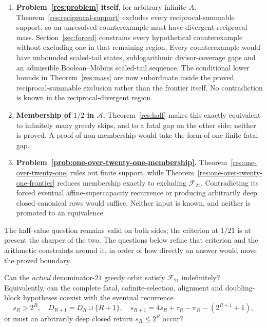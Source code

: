 \documentclass[11pt]{article}
\newcommand{\Ach}{\mathcal A}
\begin{document}
\begin{enumerate}
\item \textbf{Problem~\ref{res:problem} itself}, for arbitrary infinite $A$.
  Theorem~\ref{res:reciprocal-support} excludes every reciprocal-summable
  support, so an unresolved counterexample must have divergent reciprocal
  mass.  Section~\ref{sec:forced} constrains every hypothetical counterexample
  without excluding one in that remaining region.  Every counterexample would have
  unbounded scaled-tail states, sublogarithmic divisor-coverage gaps and an
  admissible Boolean--M\"obius scaled-tail sequence.  The conditional lower
  bounds in Theorem~\ref{res:mass} are now subordinate inside the proved
  reciprocal-summable exclusion rather than the frontier itself.  No
  contradiction is known in the reciprocal-divergent region.
\item \textbf{Membership of $1/2$ in $\Ach$.}  Theorem~\ref{res:half} makes
  this exactly equivalent to infinitely many greedy skips, and to a fatal gap
  on the other side; neither is proved.  A proof of non-membership would take
  the form of one finite fatal gap.
\item \textbf{Problem~\ref{prob:one-over-twenty-one-membership}.}
  Theorem~\ref{res:one-over-twenty-one} rules out finite support, while
  Theorem~\ref{res:one-over-twenty-one-frontier} reduces membership exactly
  to excluding $\mathcal F_{21}$.  Contradicting its forced eventual
  affine-supercapacity recurrence or producing arbitrarily deep closed
  canonical rows would suffice.  Neither input is known, and neither is
  promoted to an equivalence.
\end{enumerate}

\noindent The half-value question remains valid on both sides; the criterion at
$1/21$ is at present the sharper of the two.  The questions below refine that
criterion and the arithmetic constraints around it, in order of how directly
an answer would move the proved boundary.

\begin{problem}\label{prob:affine-supercapacity}
Can the \emph{actual} denominator-$21$ greedy orbit satisfy
$\mathcal F_{21}$ indefinitely?  Equivalently, can the complete fatal,
cofinite-selection, alignment and doubling-block hypotheses coexist with the
eventual recurrence
\[
 s_R>2^R,\quad D_{R+1}=D_R\cup\{R+1\},\quad
 s_{R+1}=4s_R+\tau_R-\pi_R-(2^{R+1}+1),
\]
or must an arbitrarily deep closed return $s_R\le2^R$ occur?
\end{problem}
\end{document}
